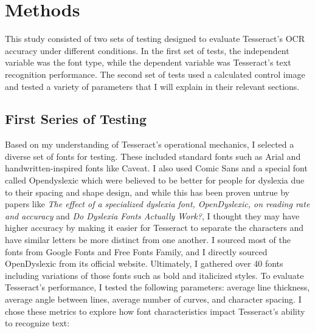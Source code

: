 \documentclass[10pt,twocolumn]{article}
\begin{document}
\section{Methods}
This study consisted of two sets of testing designed to evaluate Tesseract's OCR accuracy under different conditions. In the first set of tests, the independent variable was the font type, while the dependent variable was Tesseract’s text recognition performance. The second set of tests used a calculated control image and tested a variety of parameters that I will explain in their relevant sections. 
\subsection{First Series of Testing}
Based on my understanding of Tesseract's operational mechanics, I selected a diverse set of fonts for testing. These included standard fonts such as Arial and handwritten-inspired fonts like Caveat. I also used Comic Sans and a special font called Opendyslexic which were believed to be better for people for dyslexia due to their spacing and shape design, and while this has been proven untrue by papers like \textit{The effect of a specialized dyslexia font, OpenDyslexic, on reading rate and accuracy}\cite{effects_of_dyslexia} and \textit{Do Dyslexia Fonts Actually Work?}\cite{do_dyslexia_fonts}, I thought they may have higher accuracy by making it easier for Tesseract to separate the characters and have similar letters be more distinct from one another. I sourced most of the fonts from Google Fonts\cite{googlefonts} and Free Fonts Family\cite{freefontsfamily}, and I directly sourced OpenDyslexic\cite{opendyslexic} from its official website. Ultimately, I gathered over 40 fonts including variations of those fonts such as bold and italicized styles.
To evaluate Tesseract's performance, I tested the following parameters: average line thickness, average angle between lines, average number of curves, and character spacing. I chose these metrics to explore how font characteristics impact Tesseract’s ability to recognize text:
\end{document}
